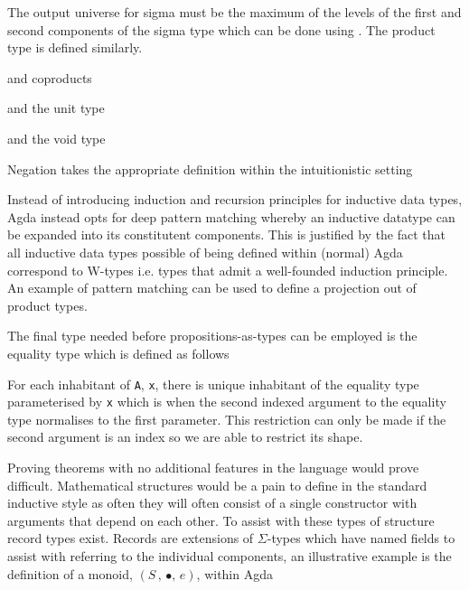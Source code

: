 
The output universe for sigma must be the maximum of the levels of the first and
second components of the sigma type which can be done using . The
product type is defined similarly.


and coproducts


and the unit type



and the void type


Negation takes the appropriate definition within the intuitionistic setting


Instead of introducing induction and recursion principles for inductive data
types, Agda instead opts for deep pattern matching whereby an inductive datatype
can be expanded into its constitutent components. This is justified by the fact
that all inductive data types possible of being defined within (normal) Agda
correspond to W-types i.e. types that admit a well-founded induction principle.
An example of pattern matching can be used to define a projection out of product
types.



The final type needed before propositions-as-types can be employed is the
equality type which is defined as follows


For each inhabitant of \verb|A|, \verb|x|, there is unique inhabitant of the
equality type parameterised by \verb|x| which is when the second indexed
argument to the equality type normalises to the first parameter. This
restriction can only be made if the second argument is an index so we are able
to restrict its shape.

Proving theorems with no additional features in the language would prove
difficult. Mathematical structures would be a pain to define in the standard
inductive style as often they will often consist of a single constructor with
arguments that depend on each other. To assist with these types of structure
record types exist. Records are extensions of $\Sigma$-types which have named
fields to assist with referring to the individual components, an illustrative
example is the definition of a monoid, $(S \, , \, \bullet , \, e)$, within Agda

